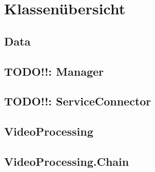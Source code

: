 \newpage
\section{Klassenübersicht}

\subsection{Data}

\newpage


\newpage


\newpage


\newpage


\newpage

\subsection{TODO!!: Manager}

\newpage


\newpage

\subsection{TODO!!: ServiceConnector}

\newpage

\subsection{VideoProcessing}

\newpage


\newpage


\newpage


\newpage

\subsection{VideoProcessing.Chain}


\newpage


